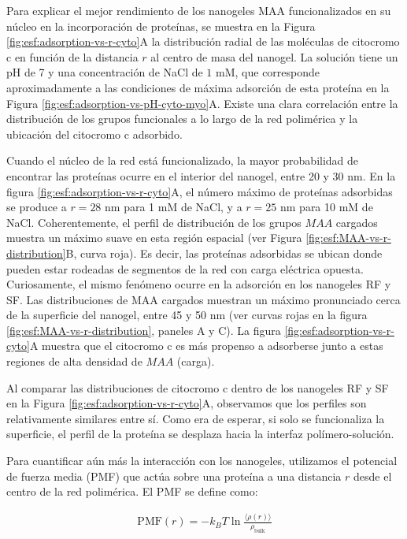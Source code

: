 Para explicar el mejor rendimiento de los nanogeles MAA funcionalizados en su n\'ucleo en la incorporaci\'on de prote\'inas, se muestra en la Figura \ref{fig:esf:adsorption-vs-r-cyto}A la distribuci\'on radial de las mol\'eculas de citocromo c en funci\'on de la distancia $r$ al centro de masa del nanogel. La soluci\'on tiene un pH de 7 y una concentraci\'on de NaCl de $1 $ mM, que corresponde aproximadamente a las condiciones de m\'axima adsorci\'on de esta prote\'ina en la Figura \ref{fig:esf:adsorption-vs-pH-cyto-myo}A. Existe una clara correlaci\'on entre la distribuci\'on de los grupos funcionales a lo largo de la red polim\'erica y la ubicaci\'on del citocromo c adsorbido.

Cuando el n\'ucleo de la red est\'a funcionalizado, la mayor probabilidad de encontrar las prote\'inas ocurre en el interior del nanogel, entre 20 y 30 nm. En la figura \ref{fig:esf:adsorption-vs-r-cyto}A, el n\'umero m\'aximo de prote\'inas adsorbidas se produce a $r=28$ nm para 1 mM de NaCl, y a $r=25$ nm para 10 mM de NaCl. Coherentemente, el perfil de distribuci\'on de los grupos $MAA$ cargados muestra un m\'aximo suave en esta regi\'on espacial (ver Figura \ref{fig:esf:MAA-vs-r-distribution}B, curva roja). Es decir, las prote\'inas adsorbidas se ubican donde pueden estar rodeadas de segmentos de la red con carga el\'ectrica opuesta. Curiosamente, el mismo fen\'omeno ocurre en la adsorci\'on en los nanogeles RF y SF. Las distribuciones de MAA cargados muestran un m\'aximo pronunciado cerca de la superficie del nanogel, entre 45 y 50 nm (ver curvas rojas en la figura \ref{fig:esf:MAA-vs-r-distribution}, paneles A y C). La figura \ref{fig:esf:adsorption-vs-r-cyto}A muestra que el citocromo c es m\'as propenso a adsorberse junto a estas regiones de alta densidad de $MAA$ (carga).



Al comparar las distribuciones de citocromo c dentro de los nanogeles RF y SF en la Figura \ref{fig:esf:adsorption-vs-r-cyto}A, observamos que los perfiles son relativamente similares entre s\'i. Como era de esperar, si solo se funcionaliza la superficie, el perfil de la prote\'ina se desplaza hacia la interfaz pol\'imero-soluci\'on.

Para cuantificar a\'un m\'as la interacci\'on con los nanogeles, utilizamos el potencial de fuerza media (PMF) que act\'ua sobre una prote\'ina a una distancia $r$ desde el centro de la red polim\'erica. El PMF se define como:

\begin{align}
	\text{PMF}(r) = -k_B T \ln \frac{\langle \rho(r)\rangle}{\rho_{\text{bulk}}}
\end{align}

